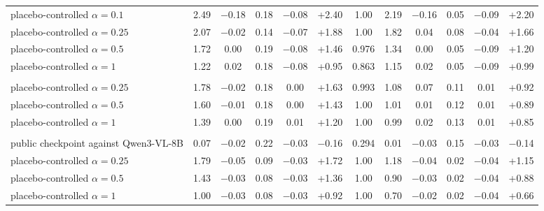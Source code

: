 \begin{table}[tbp]
\begin{tabular}{@{}>{\raggedright\arraybackslash}p{4.1cm}cccccc@{\hspace{8pt}}ccccc@{}}
placebo-controlled $\alpha{=}0.1$ & 2.49 & $-$0.18 & 0.18 & $-$0.08 & +2.40 & 1.00 & 2.19 & $-$0.16 & 0.05 & $-$0.09 & +2.20 \\
placebo-controlled $\alpha{=}0.25$ & 2.07 & $-$0.02 & 0.14 & $-$0.07 & +1.88 & 1.00 & 1.82 & 0.04 & 0.08 & $-$0.04 & +1.66 \\
placebo-controlled $\alpha{=}0.5$ & 1.72 & 0.00 & 0.19 & $-$0.08 & +1.46 & 0.976 & 1.34 & 0.00 & 0.05 & $-$0.09 & +1.20 \\
placebo-controlled $\alpha{=}1$ & 1.22 & 0.02 & 0.18 & $-$0.08 & +0.95 & 0.863 & 1.15 & 0.02 & 0.05 & $-$0.09 & +0.99 \\
\addlinespace[1pt]\multicolumn{12}{@{}l}{\textit{VideoChat-R1}} \\
placebo-controlled $\alpha{=}0.25$ & 1.78 & $-$0.02 & 0.18 & 0.00 & +1.63 & 0.993 & 1.08 & 0.07 & 0.11 & 0.01 & +0.92 \\
placebo-controlled $\alpha{=}0.5$ & 1.60 & $-$0.01 & 0.18 & 0.00 & +1.43 & 1.00 & 1.01 & 0.01 & 0.12 & 0.01 & +0.89 \\
placebo-controlled $\alpha{=}1$ & 1.39 & 0.00 & 0.19 & 0.01 & +1.20 & 1.00 & 0.99 & 0.02 & 0.13 & 0.01 & +0.85 \\
\addlinespace[1pt]\multicolumn{12}{@{}l}{\textit{TimeLens-8B}} \\
public checkpoint against Qwen3-VL-8B & 0.07 & $-$0.02 & 0.22 & $-$0.03 & $-$0.16 & 0.294 & 0.01 & $-$0.03 & 0.15 & $-$0.03 & $-$0.14 \\
placebo-controlled $\alpha{=}0.25$ & 1.79 & $-$0.05 & 0.09 & $-$0.03 & +1.72 & 1.00 & 1.18 & $-$0.04 & 0.02 & $-$0.04 & +1.15 \\
placebo-controlled $\alpha{=}0.5$ & 1.43 & $-$0.03 & 0.08 & $-$0.03 & +1.36 & 1.00 & 0.90 & $-$0.03 & 0.02 & $-$0.04 & +0.88 \\
placebo-controlled $\alpha{=}1$ & 1.00 & $-$0.03 & 0.08 & $-$0.03 & +0.92 & 1.00 & 0.70 & $-$0.02 & 0.02 & $-$0.04 & +0.66 \\
\bottomrule
\end{tabular}
\end{table}
